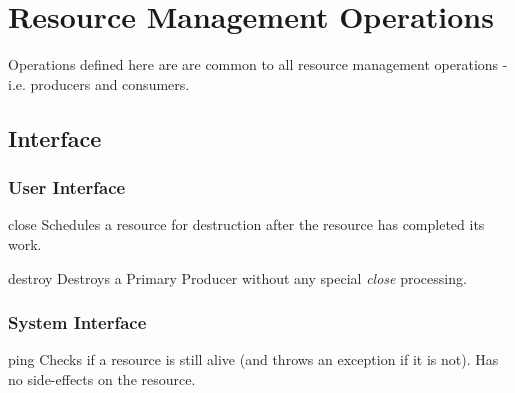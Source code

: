 \section{Resource Management Operations}\label{sec:Resource}

Operations defined here are are common to all resource management operations - i.e.
producers and consumers.

\subsection{Interface}

\subsubsection{User Interface}

\begin{method}{close}
\OK
\desc Schedules a resource for destruction after the resource has completed its work.
\end{method}

\begin{method}{destroy}
\OK
\desc 
Destroys a Primary Producer without any special \textit{close} processing.
\end{method}


\subsubsection{System Interface}

\begin{method}[resource]{ping}
\OK
\desc
Checks if a resource is still alive (and throws an exception if it is not).
Has no side-effects on the resource. 
\end{method}
